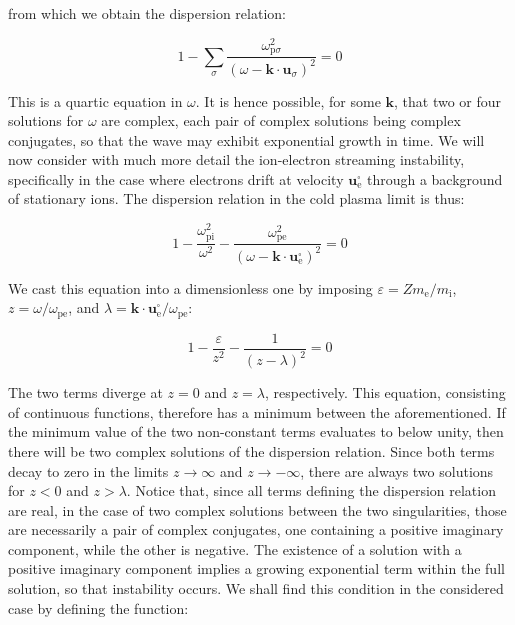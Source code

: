 from which we obtain the dispersion relation:

\begin{equation}
    1-\sum_\sigma\frac{\omega_{\mathrm{p}\sigma}^2}{(\omega-\mathbf{k}\cdot\mathbf{u}_\sigma)^2}=0
\end{equation}

This is a quartic equation in $\omega$. It is hence possible, for some $\mathbf{k}$, that two or four solutions for $\omega$ are complex, each pair of complex solutions being complex conjugates, so that the wave may exhibit exponential growth in time. We will now consider with much more detail the ion-electron streaming instability, specifically in the case where electrons drift at velocity $\mathbf{u}_{\text{e}}^\square$ through a background of stationary ions. The dispersion relation in the cold plasma limit is thus:

\begin{equation}
    1-\frac{\omega_\text{pi}^2}{\omega^2}-\frac{\omega_\text{pe}^2}{\left(\omega-\mathbf{k}\cdot\mathbf{u}_\text{e}^\square\right)^2}=0
\end{equation}

We cast this equation into a dimensionless one by imposing $\varepsilon=Zm_\text{e}/m_\mathrm{i}$, $z=\omega/\omega_\text{pe}$, and $\lambda=\mathbf{k}\cdot\mathbf{u}_\text{e}^\square/\omega_\text{pe}$:

\begin{equation}
    1-\frac{\varepsilon}{z^2}-\frac{1}{(z-\lambda)^2}=0
\end{equation}

The two terms diverge at $z=0$ and $z=\lambda$, respectively. This equation, consisting of continuous functions, therefore has a minimum between the aforementioned. If the minimum value of the two non-constant terms evaluates to below unity, then there will be two complex solutions of the dispersion relation. Since both terms decay to zero in the limits $z\to\infty$ and $z\to-\infty$, there are always two solutions for $z<0$ and $z>\lambda$. Notice that, since all terms defining the dispersion relation are real, in the case of two complex solutions between the two singularities, those are necessarily a pair of complex conjugates, one containing a positive imaginary component, while the other is negative. The existence of a solution with a positive imaginary component implies a growing exponential term within the full solution, so that instability occurs. We shall find this condition in the considered case by defining the function:

